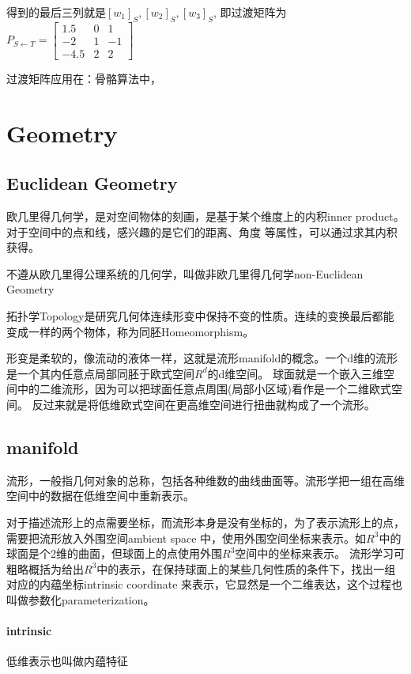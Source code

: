 得到的最后三列就是$[w_1]_S, [w_2]_S,[w_3]_S$, 即过渡矩阵为
\begin{math}
    P_{S \leftarrow T} = \begin{bmatrix}
        1.5 & 0 & 1 \\
        -2 & 1 & -1 \\
        -4.5 & 2 & 2
    \end{bmatrix}
\end{math}

过渡矩阵应用在：骨骼算法中，

\section{Geometry}

\subsection{Euclidean Geometry}
欧几里得几何学，是对空间物体的刻画，是基于某个维度上的内积inner product。对于空间中的点和线，感兴趣的是它们的距离、角度
等属性，可以通过求其内积获得。

不遵从欧几里得公理系统的几何学，叫做非欧几里得几何学non-Euclidean Geometry

拓扑学Topology是研究几何体连续形变中保持不变的性质。连续的变换最后都能变成一样的两个物体，称为同胚Homeomorphism。

形变是柔软的，像流动的液体一样，这就是流形manifold的概念。一个d维的流形是一个其内任意点局部同胚于欧式空间$R^d$的d维空间。
球面就是一个嵌入三维空间中的二维流形，因为可以把球面任意点周围(局部小区域)看作是一个二维欧式空间。
反过来就是将低维欧式空间在更高维空间进行扭曲就构成了一个流形。

\subsection{manifold}

流形，一般指几何对象的总称，包括各种维数的曲线曲面等。流形学把一组在高维空间中的数据在低维空间中重新表示。

对于描述流形上的点需要坐标，而流形本身是没有坐标的，为了表示流形上的点，需要把流形放入外围空间ambient space
中，使用外围空间坐标来表示。如$R^3$中的球面是个2维的曲面，但球面上的点使用外围$R^3$空间中的坐标来表示。
流形学习可粗略概括为给出$R^3$中的表示，在保持球面上的某些几何性质的条件下，找出一组对应的内蕴坐标intrinsic coordinate 
来表示，它显然是一个二维表达，这个过程也叫做参数化parameterization。

\paragraph{intrinsic}
低维表示也叫做内蕴特征


